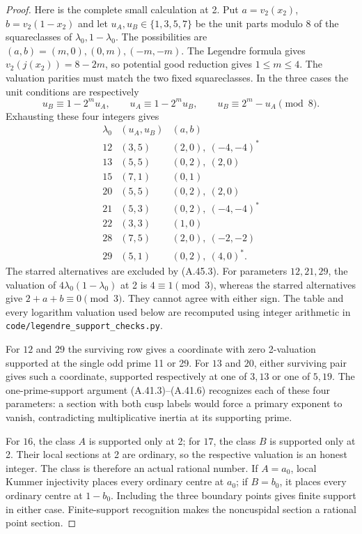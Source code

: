 \begin{proof}
Here is the complete small calculation at 2.  Put
$a=v_2(x_2)$, $b=v_2(1-x_2)$ and let $u_A,u_B\in\{1,3,5,7\}$
be the unit parts modulo 8 of the squareclasses of
$\lambda_0,1-\lambda_0$.  The possibilities are
$(a,b)=(m,0),(0,m),(-m,-m)$.  The Legendre formula gives
$v_2(j(x_2))=8-2m$, so potential good reduction gives $1\leq m\leq4$.
The valuation parities must match the two fixed squareclasses.
In the three cases the unit conditions are respectively
\[
 u_B\equiv1-2^m u_A,\qquad
 u_A\equiv1-2^m u_B,\qquad
 u_B\equiv2^m-u_A\pmod8.
\tag{A.45.4}
\]
Exhausting these four integers gives
\[
\begin{array}{c|c|l}
 \lambda_0&(u_A,u_B)&(a,b)\\ \hline
 12&(3,5)&(2,0),\ (-4,-4)^*\\
 13&(5,5)&(0,2),\ (2,0)\\
 15&(7,1)&(0,1)\\
 20&(5,5)&(0,2),\ (2,0)\\
 21&(5,3)&(0,2),\ (-4,-4)^*\\
 22&(3,3)&(1,0)\\
 28&(7,5)&(2,0),\ (-2,-2)\\
 29&(5,1)&(0,2),\ (4,0)^*.
\end{array}
\tag{A.45.5}
\]
The starred alternatives are excluded by (A.45.3).  For parameters
$12,21,29$, the valuation of $4\lambda_0(1-\lambda_0)$ at 2 is
$4\equiv1\pmod3$, whereas the starred alternatives give
$2+a+b\equiv0\pmod3$.  They cannot agree with either sign.
The table and every logarithm valuation used below are recomputed
using integer arithmetic in \texttt{code/legendre\_support\_checks.py}.

For $12$ and $29$ the surviving row gives a coordinate with zero
2-valuation supported at the single odd prime 11 or 29.  For
$13$ and $20$, either surviving pair gives such a coordinate,
supported respectively at one of $3,13$ or one of $5,19$.
The one-prime-support argument (A.41.3)--(A.41.6) recognizes each
of these four parameters: a section with both cusp labels would
force a primary exponent to vanish, contradicting multiplicative
inertia at its supporting prime.

For $16$, the class $A$ is supported only at 2; for $17$, the
class $B$ is supported only at 2.  Their local sections at 2 are
ordinary, so the respective valuation is an honest integer.
The class is therefore an actual rational number.  If $A=a_0$,
local Kummer injectivity places every ordinary centre at $a_0$;
if $B=b_0$, it places every ordinary centre at $1-b_0$.
Including the three boundary points gives finite support in either
case.  Finite-support recognition makes the noncuspidal section
a rational point section.


\end{proof}
